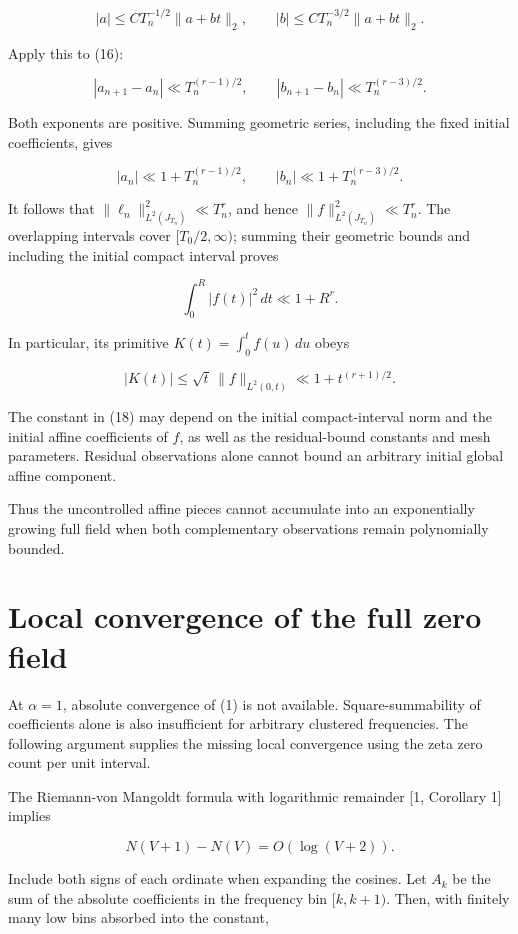 \documentclass[
  11pt,
]{article}
\begin{document}
\[
|a|\le C T_n^{-1/2}\|a+bt\|_2,
\qquad
|b|\le C T_n^{-3/2}\|a+bt\|_2. \tag{17}
\]

Apply this to (16):

\[
|a_{n+1}-a_n|\ll T_n^{(r-1)/2},
\qquad
|b_{n+1}-b_n|\ll T_n^{(r-3)/2}.
\]

Both exponents are positive. Summing geometric series, including the
fixed initial coefficients, gives

\[
|a_n|\ll1+T_n^{(r-1)/2},
\qquad
|b_n|\ll1+T_n^{(r-3)/2}.
\]

It follows that \(\|\ell_n\|_{L^2(J_{T_n})}^2\ll T_n^r\), and hence
\(\|f\|_{L^2(J_{T_n})}^2\ll T_n^r\). The overlapping intervals cover
\([T_0/2,\infty)\); summing their geometric bounds and including the
initial compact interval proves

\[
\boxed{\int_0^R|f(t)|^2\,dt\ll1+R^r.} \tag{18}
\]

In particular, its primitive \(K(t)=\int_0^t f(u)\,du\) obeys

\[
|K(t)|\le\sqrt{t}\,\|f\|_{L^2(0,t)}
\ll1+t^{(r+1)/2}. \tag{19}
\]

The constant in (18) may depend on the initial compact-interval norm and
the initial affine coefficients of \(f\), as well as the residual-bound
constants and mesh parameters. Residual observations alone cannot bound
an arbitrary initial global affine component.

Thus the uncontrolled affine pieces cannot accumulate into an
exponentially growing full field when both complementary observations
remain polynomially bounded.

\hypertarget{local-convergence-of-the-full-zero-field}{%
\section{Local convergence of the full zero
field}\label{local-convergence-of-the-full-zero-field}}

At \(\alpha=1\), absolute convergence of (1) is not available.
Square-summability of coefficients alone is also insufficient for
arbitrary clustered frequencies. The following argument supplies the
missing local convergence using the zeta zero count per unit interval.

The Riemann-von Mangoldt formula with logarithmic remainder {[}1,
Corollary 1{]} implies

\[
N(V+1)-N(V)=O(\log(V+2)). \tag{20}
\]

Include both signs of each ordinate when expanding the cosines. Let
\(A_k\) be the sum of the absolute coefficients in the frequency bin
\([k,k+1)\). Then, with finitely many low bins absorbed into the
constant,
\end{document}
